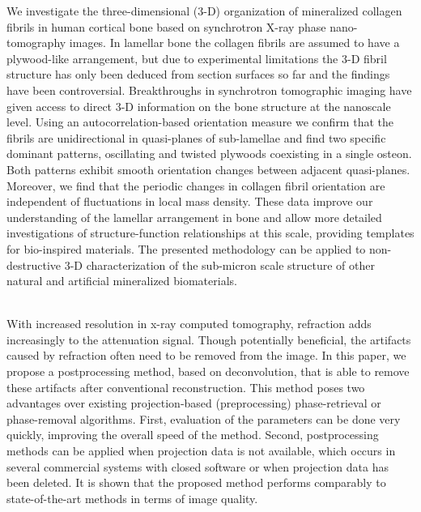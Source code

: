 {{\begin{enumerate}
We investigate the three-dimensional (3-D) organization of mineralized collagen fibrils in human cortical bone based on synchrotron X-ray phase nano-tomography images. In lamellar bone the collagen fibrils are assumed to have a plywood-like arrangement, but due to experimental limitations the 3-D fibril structure has only been deduced from section surfaces so far and the findings have been controversial. Breakthroughs in synchrotron tomographic imaging have given access to direct 3-D information on the bone structure at the nanoscale level. Using an autocorrelation-based orientation measure we confirm that the fibrils are unidirectional in quasi-planes of sub-lamellae and find two specific dominant patterns, oscillating and twisted plywoods coexisting in a single osteon. Both patterns exhibit smooth orientation changes between adjacent quasi-planes. Moreover, we find that the periodic changes in collagen fibril orientation are independent of fluctuations in local mass density. These data improve our understanding of the lamellar arrangement in bone and allow more detailed investigations of structure-function relationships at this scale, providing templates for bio-inspired materials. The presented methodology can be applied to non-destructive 3-D characterization of the sub-micron scale structure of other natural and artificial mineralized biomaterials. 

\\ \aabstract
With increased resolution in x-ray computed tomography, refraction adds increasingly to the attenuation signal. Though potentially beneficial, the artifacts caused by refraction often need to be removed from the image. In this paper, we propose a postprocessing method, based on deconvolution, that is able to remove these artifacts after conventional reconstruction. This method poses two advantages over existing projection-based (preprocessing) phase-retrieval or phase-removal algorithms. First, evaluation of the parameters can be done very quickly, improving the overall speed of the method. Second, postprocessing methods can be applied when projection data is not available, which occurs in several commercial systems with closed software or when projection data has been deleted. It is shown that the proposed method performs comparably to state-of-the-art methods in terms of image quality.





\end{enumerate}}}
